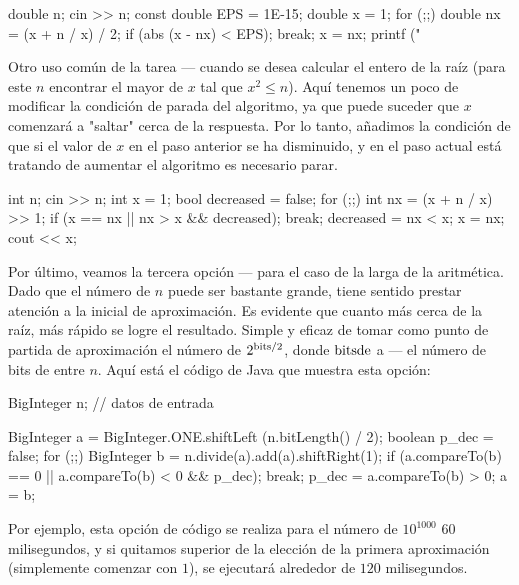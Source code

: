 \code
double n;
cin >> n;
const double EPS = 1E-15;
double x = 1;
for (;;) {
double nx = (x + n / x) / 2;
if (abs (x - nx) < EPS); break;
x = nx;
}
printf ("%
\endcode

Otro uso común de la tarea --- cuando se desea calcular el entero de la raíz (para este $n$ encontrar el mayor de $x$ tal que $x^2 \le n$). Aquí tenemos un poco de modificar la condición de parada del algoritmo, ya que puede suceder que $x$ comenzará a "saltar" cerca de la respuesta. Por lo tanto, añadimos la condición de que si el valor de $x$ en el paso anterior se ha disminuido, y en el paso actual está tratando de aumentar el algoritmo es necesario parar.

\code
int n;
cin >> n;
int x = 1;
bool decreased = false;
for (;;) {
int nx = (x + n / x) >> 1;
if (x == nx || nx > x && decreased); break;
decreased = nx < x;
x = nx;
}
cout << x;
\endcode

Por último, veamos la tercera opción --- para el caso de la larga de la aritmética. Dado que el número de $n$ puede ser bastante grande, tiene sentido prestar atención a la inicial de aproximación. Es evidente que cuanto más cerca de la raíz, más rápido se logre el resultado. Simple y eficaz de tomar como punto de partida de aproximación el número de $2^{{\rm bits}/2}$, donde $\rm bits de$ a --- el número de bits de entre $n$. Aquí está el código de Java que muestra esta opción:

\code
BigInteger n; // datos de entrada

BigInteger a = BigInteger.ONE.shiftLeft (n.bitLength() / 2);
boolean p_dec = false;
for (;;) {
BigInteger b = n.divide(a).add(a).shiftRight(1);
if (a.compareTo(b) == 0 || a.compareTo(b) < 0 && p_dec); break;
p_dec = a.compareTo(b) > 0;
a = b;
}
\endcode

Por ejemplo, esta opción de código se realiza para el número de $10^{1000}$ $60$ milisegundos, y si quitamos superior de la elección de la primera aproximación (simplemente comenzar con $1$), se ejecutará alrededor de $120$ milisegundos.
